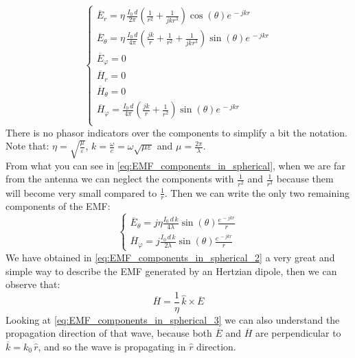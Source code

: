 \begin{equation}\label{eq:EMF_components_in_spherical}
    \begin{cases}
        \overline{E}_r=\eta \, \frac{I_0\, d}{2\pi}\left(\frac{1}{r^2}+\frac{1}{jkr^3}\right)\cos(\theta)e^{\,-jkr}\\[5pt]
        \overline{E}_\theta=\eta\,\frac{I_0\,d}{4\pi}\left(\frac{jk}{r}+\frac{1}{r^2}+\frac{1}{jkr^3}\right)\sin(\theta)e^{\,-jkr}\\[5pt]
        \overline{E}_\varphi=0\\[5pt]
        \overline{H}_r=0\\[5pt]
        \overline{H}_\theta=0\\[5pt]
        \overline{H}_\varphi=\frac{I_0\,d}{4\pi}\left(\frac{jk}{r}+\frac{1}{r^2}\right)\sin(\theta)e^{\,-jkr}\\[5pt]
    \end{cases}
\end{equation}
There is no phasor indicators over the components to simplify a bit the notation.\\
Note that: $\eta =\sqrt{\frac{\mu}{\varepsilon}}$, $k=\frac{\omega}{c}=\omega\sqrt{\mu\varepsilon}$ and $\mu=\frac{2\pi}{\lambda}$.\\
From what you can see in \cref{eq:EMF_components_in_spherical}, when we are far from the antenna we can neglect the components with $\frac{1}{r^2}$ and $\frac{1}{r^3}$ because them will become very small compared to $\frac{1}{r}$. Then we can write the only two remaining components of the EMF:
\begin{equation}\label{eq:EMF_components_in_spherical_2}
\begin{cases}
    \overline{E}_\theta = j\eta \frac{I_0\,d\,k}{4\lambda}\sin(\theta)\frac{e^{\,-jkr}}{r}\\[5pt]
    \overline{H}_\varphi = j\frac{I_0\,d\,k}{2\lambda}\sin(\theta)\frac{e^{\,-jkr}}{r}
\end{cases}
\end{equation}
We have obtained in \cref{eq:EMF_components_in_spherical_2} a very great and simple way to describe the EMF generated by an Hertzian dipole, then we can observe that:
\begin{equation}\label{eq:EMF_components_in_spherical_3}
    \overline{H}=\frac{1}{\eta}\,\hat{k}\times\overline{E} 
\end{equation}
Looking at \cref{eq:EMF_components_in_spherical_3} we can also understand the propagation direction of that wave, because both $\overline{E}$ and $\overline{H}$ are perpendicular to $\overline{k}=k_0\,\hat{r}$, and so the wave is propagating in $\hat{r}$ direction.\\
